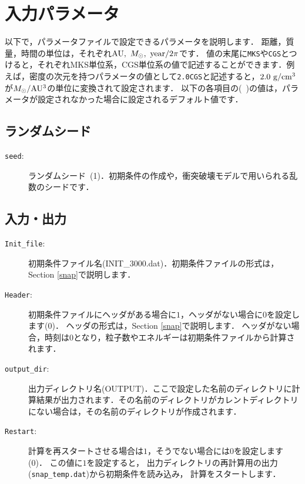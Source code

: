 \documentclass[12pt,a4paper,dvipdfmx]{jsarticle}
\begin{document}
  
\section{入力パラメータ\label{parameter}}

以下で，パラメータファイルで設定できるパラメータを説明します．
距離，質量，時間の単位は，それぞれ${\rm AU},\ M_{\odot},\ {\rm year}/2\pi$です．
値の末尾に\texttt{MKS}や\texttt{CGS}とつけると，それぞれMKS単位系，CGS単位系の値で記述することができます．例えば，密度の次元を持つパラメータの値として\texttt{2.0CGS}と記述すると，$2.0\ {\rm g/cm^{3}}$が$M_{\odot}/{\rm AU^{3}}$の単位に変換されて設定されます．
以下の各項目の(\ )の値は，パラメータが設定されなかった場合に設定されるデフォルト値です．

\subsection{ランダムシード}
\begin{description}
\item[\texttt{seed}:]
ランダムシード\ (1)．初期条件の作成や，衝突破壊モデルで用いられる乱数のシードです．
\end{description}

\subsection{入力・出力}
\begin{description}
\item[\texttt{Init\_file}:]
初期条件ファイル名(INIT\_3000.dat)．初期条件ファイルの形式は，Section \ref{snap}で説明します．
\item[\texttt{Header}:]
初期条件ファイルにヘッダがある場合に$1$，ヘッダがない場合に$0$を設定します(0)．
ヘッダの形式は，Section \ref{snap}で説明します．
ヘッダがない場合，時刻は$0$となり，粒子数やエネルギーは初期条件ファイルから計算されます．
\item[\texttt{output\_dir}:]
出力ディレクトリ名(OUTPUT)．ここで設定した名前のディレクトリに計算結果が出力されます．その名前のディレクトリがカレントディレクトリにない場合は，その名前のディレクトリが作成されます．
\item[\texttt{Restart}:]
計算を再スタートさせる場合は$1$，そうでない場合には$0$を設定します(0)．
この値に$1$を設定すると，
出力ディレクトリの再計算用の出力(\texttt{snap\_temp.dat})から初期条件を読み込み，
計算をスタートします．

\end{description}
\end{document}
